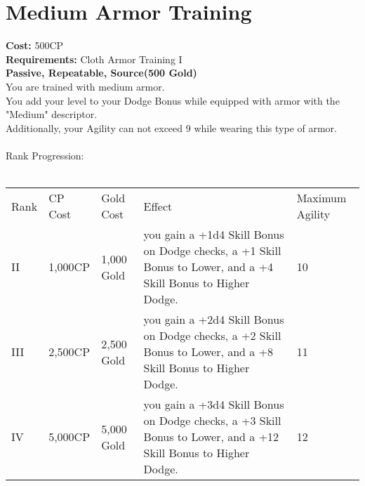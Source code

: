 \section{Medium Armor Training}\label{perk:mediumArmorTraining}
\textbf{Cost:} 500CP\\
\textbf{Requirements:} Cloth Armor Training I\\
\textbf{Passive, Repeatable, Source(500 Gold)}\\
You are trained with medium armor.\\
You add your level to your Dodge Bonus while equipped with armor with the "Medium" descriptor.\\
Additionally, your Agility can not exceed 9 while wearing this type of armor.\\
\\
Rank Progression:\\
\\
\begin{tabular}{l | l | l | l | l}
	Rank & CP Cost & Gold Cost & Effect & Maximum Agility
	\\
	II
	& 1,000CP
	& 1,000 Gold
	& you gain a +1d4 Skill Bonus on Dodge checks, a +1 Skill Bonus to Lower, and a +4 Skill Bonus to Higher Dodge.
	& 10
	\\
	III
	& 2,500CP
	& 2,500 Gold
	& you gain a +2d4 Skill Bonus on Dodge checks, a +2 Skill Bonus to Lower, and a +8 Skill Bonus to Higher Dodge.
	& 11
	\\
	IV
	& 5,000CP
	& 5,000 Gold
	& you gain a +3d4 Skill Bonus on Dodge checks, a +3 Skill Bonus to Lower, and a +12 Skill Bonus to Higher Dodge.
	& 12
	\\
\end{tabular}
